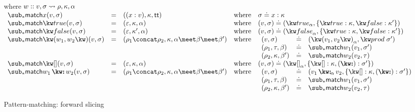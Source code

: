\begin{figure}[H]
\flushleft {}
 where $w :: v, \sigma \rightsquigarrow \rho, \kappa, \alpha$ \\
 \small
\vspace{3mm}
$\begin{array}{lllll}
   \matchFwdF{x}(v, \sigma)
   &=&
   (\bind{x}{v}, \kappa, \TT)
   &\text{where}&
   \sigma \eq \elimVar{x}{\kappa}
   \\
   \matchFwdF{\matchTrueNew}(v, \sigma)
   &=&
   (\seqEmpty, \kappa, \alpha)
   &\text{where}&
   (v, \sigma) \eq (\annTrue{\alpha}, \elimBool{\kappa}{\kappa'})
   \\
   \matchFwdF{\matchFalseNew}(v, \sigma)
   &=&
   (\seqEmpty, \kappa', \alpha)
   &\text{where}&
   (v, \sigma) \eq (\annFalse{\alpha}, \elimBool{\kappa}{\kappa'})
   \\
   \matchFwdF{\matchPair{w_1}{w_2}}(v, \sigma)
   &=&
   (\rho_1 \concat \rho_2, \kappa, \alpha \meet \beta \meet \beta')
   &\text{where}&
   \begin{array}[t]{lll}
      (v, \sigma) &\eq& (\annPair{v_1}{v_2}{\alpha}, \elimProd{\sigma'})
      \\
      (\rho_1, \tau, \beta) &\eq& \matchFwdF{w_1}(v_1,\sigma')
      \\
      (\rho_2, \kappa, \beta') &\eq& \matchFwdF{w_2}(v_2,\tau)
   \end{array}
   \\
   \matchFwdF{\matchNilNew}(v, \sigma)
   &=&
   (\seqEmpty, \kappa, \alpha)
   &\text{where}&
   (v, \sigma) \eq (\annNil{\alpha}, \elimList{\kappa}{\sigma'})
   \\
   \matchFwdF{\matchConsNew{w_1}{w_2}}(v, \sigma)
   &=&
   (\rho_1 \concat \rho_2, \kappa, \alpha \meet \beta \meet \beta')
   &\text{where}&
   \begin{array}[t]{lll}
      (v, \sigma) &\eq& (\annCons{v_1}{v_2}{\alpha}, \elimList{\kappa}{\sigma'})
      \\
      (\rho_1, \tau, \beta) &\eq& \matchFwdF{w_1}(v_1,\sigma')
      \\
      (\rho_2, \kappa, \beta') &\eq& \matchFwdF{w_2}(v_2,\tau)
   \end{array}
\end{array}$
\caption{Pattern-matching: forward slicing}
\label{fig:match:fwd}
\end{figure}
